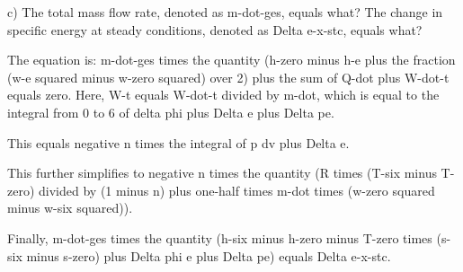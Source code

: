 c) The total mass flow rate, denoted as m-dot-ges, equals what? The change in specific energy at steady conditions, denoted as Delta e-x-stc, equals what?

The equation is:
m-dot-ges times the quantity (h-zero minus h-e plus the fraction (w-e squared minus w-zero squared) over 2) plus the sum of Q-dot plus W-dot-t equals zero. Here, W-t equals W-dot-t divided by m-dot, which is equal to the integral from 0 to 6 of delta phi plus Delta e plus Delta pe.

This equals negative n times the integral of p dv plus Delta e.

This further simplifies to negative n times the quantity (R times (T-six minus T-zero) divided by (1 minus n) plus one-half times m-dot times (w-zero squared minus w-six squared)).

Finally, m-dot-ges times the quantity (h-six minus h-zero minus T-zero times (s-six minus s-zero) plus Delta phi e plus Delta pe) equals Delta e-x-stc.